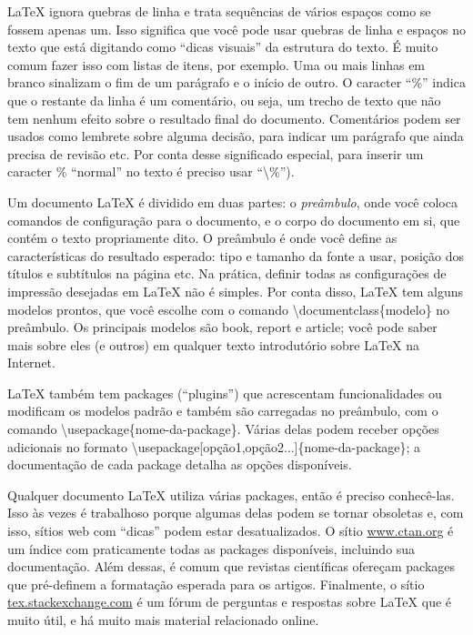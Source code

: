 \LaTeX{} ignora quebras de linha e trata sequências de vários espaços como
se fossem apenas um. Isso significa que você pode usar quebras de linha e
espaços no texto que está digitando como ``dicas visuais'' da estrutura do
texto. É muito comum fazer isso com listas de itens, por exemplo. Uma ou
mais linhas em branco sinalizam o fim de um parágrafo e o início de outro.
O caracter ``\%'' indica que o restante da linha é um comentário,
ou seja, um trecho de texto que não tem nenhum efeito sobre o resultado final
do documento. Comentários podem ser usados como lembrete sobre alguma decisão,
para indicar um parágrafo que ainda precisa de revisão etc. Por conta desse
significado especial, para inserir um caracter \% ``normal'' no
texto é preciso usar ``\textbackslash\%'').

Um documento \LaTeX{} é dividido em duas partes: o \emph{preâmbulo}, onde
você coloca comandos de configuração para o documento, e o corpo do
documento em si, que contém o texto propriamente dito. O preâmbulo é onde
você define as características do resultado esperado: tipo e tamanho da
fonte a usar, posição dos títulos e subtítulos na página etc. Na prática,
definir todas as configurações de impressão desejadas em \LaTeX{} não é
simples. Por conta disso, \LaTeX{} tem alguns modelos prontos, que você
escolhe com o comando \textsf{\textbackslash{}documentclass\{modelo\}}
no preâmbulo. Os principais modelos são \textsf{book}, \textsf{report} e
\textsf{article}; você pode saber mais sobre eles (e outros) em qualquer
texto introdutório sobre \LaTeX{} na Internet.

\LaTeX{} também tem packages (``plugins'') que acrescentam funcionalidades
ou modificam os modelos padrão e também são carregadas no preâmbulo, com o
comando \textsf{\textbackslash{}usepackage\{nome-da-package\}}. Várias
delas podem receber opções adicionais no formato
\textsf{\textbackslash{}usepackage[opção1,opção2...]\{nome-da-package\}};
a documentação de cada package detalha as opções disponíveis.

Qualquer documento \LaTeX{} utiliza várias packages, então é preciso
conhecê-las. Isso às vezes é trabalhoso porque algumas delas podem se
tornar obsoletas e, com isso, sítios web com ``dicas'' podem estar
desatualizados. O sítio \url{www.ctan.org} é um índice com praticamente
todas as packages disponíveis, incluindo sua documentação. Além dessas,
é comum que revistas científicas ofereçam packages que pré-definem a
formatação esperada para os artigos. Finalmente, o sítio
\url{tex.stackexchange.com} é um fórum de perguntas e respostas sobre
\LaTeX{} que é muito útil, e há muito mais material relacionado online.

